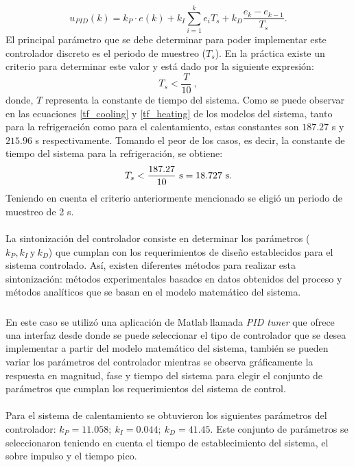 \begin{equation}
 u_{PID}(k) = k_{P}\cdot e(k) + k_{I} \displaystyle\sum_{i=1}^{k} e_{i}T_s + k_{D}\frac{e_k-e_{k-1}}{T_s}.
\label{pid_eq}
\end{equation}
El principal parámetro que se debe determinar para poder implementar este controlador discreto es el periodo de muestreo ($T_s$). En la práctica existe un criterio para determinar este valor y está dado por la siguiente expresión:
$$
T_s < \frac{T}{10} ~,
$$
donde, $T$ representa la constante de tiempo del sistema. Como se puede observar en las ecuaciones \ref{tf_cooling} y \ref{tf_heating} de los modelos del sistema, tanto para la refrigeración como para el calentamiento, estas constantes son  $187.27$ s y $215.96$ s respectivamente. Tomando el peor de los casos, es decir, la constante de tiempo del sistema para la refrigeración, se obtiene:
$$
T_s < \frac{187.27}{10} ~\mbox{s} = 18.727 ~\mbox{s}.\\
$$
Teniendo en cuenta el criterio anteriormente mencionado se eligió un periodo de muestreo de 2 s. \\ \\
La sintonización del controlador consiste en determinar los parámetros ($k_P, k_I~ \mbox{y}~ k_D$) que cumplan con los requerimientos de diseño establecidos para el sistema controlado. Así, existen diferentes métodos para realizar esta sintonización: métodos experimentales basados en datos obtenidos del proceso y métodos analíticos que se basan en el modelo matemático del sistema. \\ \\
En este caso se utilizó una aplicación de Matlab\textsuperscript \textregistered  $~$llamada \textit{PID tuner} que ofrece una interfaz desde donde se puede seleccionar el tipo de controlador que se desea implementar a partir del modelo matemático del sistema, también se pueden variar los parámetros del controlador mientras se observa gráficamente la respuesta en magnitud, fase y tiempo del sistema para elegir el conjunto de parámetros que cumplan los requerimientos del sistema de control.\\ \\
Para el sistema de calentamiento se obtuvieron los siguientes parámetros del controlador: $k_P= 11.058;~k_I= 0.044;~k_D=41.45$. Este conjunto de parámetros se seleccionaron teniendo en cuenta el tiempo de establecimiento del sistema, el sobre impulso y el tiempo pico.\\ \\
